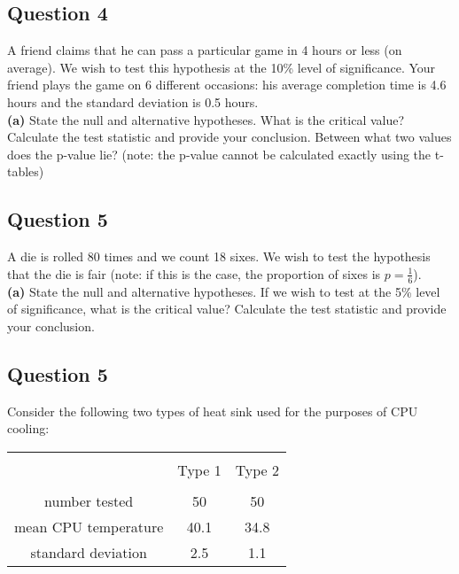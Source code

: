 



\subsection*{Question 4}
A friend claims that he can pass a particular game in 4 hours or less (on average). We wish to test this hypothesis at the 10\% level of significance. Your friend plays the game on 6 different occasions: his average completion time is 4.6 hours and the standard deviation is 0.5 hours. \\[-0.2cm]

{\bf(a)} State the null and alternative hypotheses.  What is the critical value?  Calculate the test statistic and provide your conclusion.  Between what two values does the p-value lie? (note: the p-value cannot be calculated exactly using the t-tables)



\subsection*{Question 5}
A die is rolled 80 times and we count 18 sixes. We wish to test the hypothesis that the die is fair (note: if this is the case, the proportion of sixes is $p = \frac{1}{6}$). \\[-0.2cm]

{\bf(a)} State the null and alternative hypotheses.  If we wish to test at the 5\% level of significance, what is the critical value?  Calculate the test statistic and provide your conclusion.



	\newpage\subsection*{Question 5}
	Consider the following two types of heat sink used for the purposes of CPU cooling:\\[-0.4cm]
	\begin{center}
		\begin{tabular}{|c|c|c|}
			\hline
			&&\\[-0.3cm]
			& Type 1 & Type 2 \\
			\hline
			&&\\[-0.3cm]
			number tested      & 50 & 50 \\
			mean CPU temperature   & 40.1  & 34.8 \\
			standard deviation &  2.5 & 1.1 \\[0.1cm]
			\hline
		\end{tabular}
	\end{center}
	
